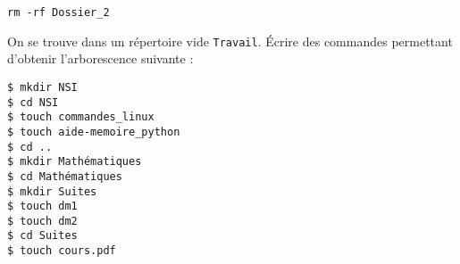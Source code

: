\documentclass[a4paper,dvipsnames]{article}
\newenvironment{correction}{\color{blue}}{}
\begin{document}
\begin{exercice}[breakable]{}{}
\begin{enumerate}
      \begin{correction}
        \begin{center}
	  \texttt{rm -rf Dossier_2}
        \end{center}
      \end{correction}
      
  \end{enumerate}
\end{exercice}

\smallskip

\begin{exercice}{}{}
  On se trouve dans un répertoire vide \texttt{Travail}. Écrire des commandes permettant d'obtenir l'arborescence suivante :
  
  \bigskip


  \begin{correction}
      \begin{verbatim}
$ mkdir NSI
$ cd NSI
$ touch commandes_linux
$ touch aide-memoire_python
$ cd ..
$ mkdir Mathématiques
$ cd Mathématiques
$ mkdir Suites
$ touch dm1
$ touch dm2
$ cd Suites
$ touch cours.pdf
      \end{verbatim}
  \end{correction}
  

\end{exercice}
\end{document}
